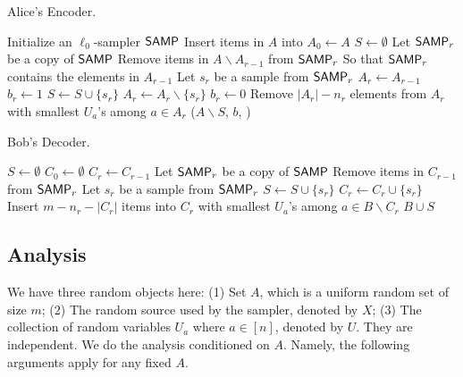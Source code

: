 \begin{algorithm}[H] 
  \caption{Alice's Encoder.} \label{algo:enc}
  \begin{algorithmic}[1]
    \State Initialize an $\ell_0$-sampler $\textsf{SAMP}$
    \State Insert items in $A$ into \samp
    \State $A_0 \leftarrow A$
    \State $S\leftarrow \emptyset$
      \State Let $\textsf{SAMP}_r$ be a copy of $\textsf{SAMP}$
      \State Remove items in $A\backslash A_{r-1}$ from $\textsf{SAMP}_r$ \Comment So that $\textsf{SAMP}_r$ contains the elements in $A_{r-1}$
      \State Let $s_r$ be a sample from $\textsf{SAMP}_r$
      \State $A_r\leftarrow A_{r-1}$
       
        \State $b_r\leftarrow 1$ 
        \State $S\leftarrow S \cup \{s_r\}$
        \State $A_r\leftarrow A_r \backslash \{s_r\}$
      \Else 
        \State $b_r\leftarrow 0$
      \EndIf
      \State Remove $|A_r|-n_r$ elements from $A_r$ with smallest $U_a$'s among $a\in A_r$ 
    \EndFor
    \State \Return ($A\backslash S$, $b$, \samp) 
    \EndProcedure
  \end{algorithmic}
\end{algorithm}

\begin{algorithm}[H] 
  \caption{Bob's Decoder.} \label{algo:dec}
  \begin{algorithmic}[1]
    \State $S\leftarrow \emptyset$
    \State $C_0 \leftarrow \emptyset$
      \State $C_r\leftarrow C_{r-1}$
        \State Let $\textsf{SAMP}_r$ be a copy of $\textsf{SAMP}$
        \State Remove items in $C_{r-1}$ from $\textsf{SAMP}_r$ 
        \State Let $s_r$ be a sample from $\textsf{SAMP}_r$
        \State $S\leftarrow S \cup \{s_r\}$
        \State $C_r\leftarrow C_r \cup \{s_r\}$
      \EndIf
       \State Insert $m-n_r-|C_r|$ items into $C_r$ with smallest $U_a$'s among $a\in B\backslash C_r$
    \EndFor
    \State \Return $B\cup S$ 
    \EndProcedure
  \end{algorithmic}
\end{algorithm}

\subsection{Analysis}

We have three random objects here: (1) Set $A$, which is a uniform random set of size $m$; (2) The random source used by the sampler, denoted by $X$; (3) The collection of random variables $U_a$ where $a\in [n]$, denoted by $U$. They are independent. We do the analysis conditioned on $A$. Namely, the following arguments apply for any fixed $A$. 

